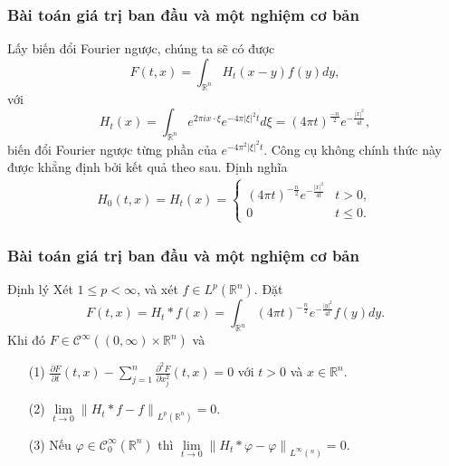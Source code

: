 \documentclass[11pt]{beamer}
\numberwithin{equation}{section}
\theoremstyle{plain}
\theoremstyle{definition}
\theoremstyle{remark}
\begin{document}
\begin{frame}\frametitle{Bài toán giá trị ban đầu và một nghiệm cơ bản}
Lấy biến đổi Fourier ngược, chúng ta sẽ có được
\[F\left( {t,x} \right) = \int_{{\mathbb{R}^n}} {{H_t}\left( {x - y} \right)f\left( y \right)dy} ,\]
với 
\[{H_t}\left( x \right) = \int_{{\mathbb{R}^n}} {{e^{2\pi ix \cdot \xi }}{e^{ - 4\pi {{\left| \xi  \right|}^2}t}}d\xi }  = {\left( {4\pi t} \right)^{\frac{{ - n}}{2}}}{e^{ - \frac{{{{\left| x \right|}^2}}}{{4t}}}},\]
biến đổi Fourier ngược từng phần của ${e^{ - 4{\pi ^2}{{\left| \xi  \right|}^2}t}}$. Công cụ không chính thức này được khẳng định bởi kết quả theo sau. Định nghĩa 
\begin{align}\label{59}
{H_0}\left( {t,x} \right) = {H_t}\left( x \right) = \left\{ {\begin{array}{*{20}{c}}
{{{\left( {4\pi t} \right)}^{ - \frac{n}{2}}}{e^{ - \frac{{{{\left| x \right|}^2}}}{{4t}}}}}&{t > 0,}\\
0&{t \le 0.}
\end{array}} \right.
\end{align}
\end{frame}
\begin{frame}\frametitle{Bài toán giá trị ban đầu và một nghiệm cơ bản}
\begin{block}{Định lý\label{3.1}}
Xét $1\le p<\infty$, và xét $f\in L^{p}\left(\mathbb{R}^{n}\right)$. Đặt 
\[F\left( {t,x} \right) = {H_t}*f\left( x \right) = \int_{{\mathbb{R}^n}} {{{\left( {4\pi t} \right)}^{ - \frac{n}{2}}}{e^{ - \frac{{{{\left| {y} \right|}^2}}}{{4t}}}}f\left( y \right)dy} .\]
Khi đó $F\in\mathcal{C}^{\infty}\left( {\left( {0,\infty } \right) \times {\mathbb{R }^n}} \right)$ và 
\begin{itemize}
\item[(1)] $\frac{{\partial F}}{{\partial t}}\left( {t,x} \right) - \sum\limits_{j = 1}^n {\frac{{{\partial ^2}F}}{{\partial x_j^2}}} \left( {t,x} \right) = 0$ với $t>0$ và $x\in\mathbb{R}^n$.
\item[(2)] $\mathop {\lim }\limits_{t \to 0} {\left\| {{H_t}*f - f} \right\|_{{L^p}\left( {{\mathbb{R}^n}} \right)}} = 0$.
\item[(3)] Nếu $\varphi\in\mathcal{C}_{0}^{\infty}\left(\mathbb{R}^{n}\right)$ thì $\mathop {\lim }\limits_{t \to 0} {\left\| {{H_t}*\varphi  - \varphi } \right\|_{{L^\infty }\left( {{^n}} \right)}} = 0$.
\end{itemize}
\end{block}
\end{frame}
\end{document}
